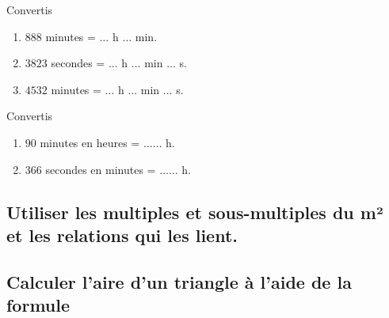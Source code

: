 
Convertis

\begin{enumerate}
\item $888$ minutes = $\ldots$ h  $\ldots$ min.
\item $3823$ secondes = $\ldots$ h $\ldots$ min  $\ldots$ s. 
\item $4532$ minutes = $\ldots$ h  $\ldots$ min  $\ldots$ s. 
\end{enumerate}




Convertis

\begin{enumerate}
\item $90$ minutes en heures = $\ldots\ldots$ h.
\item $366$ secondes en minutes = $\ldots\ldots$ h.
\end{enumerate}







\subsection{ Utiliser les multiples et sous-multiples du m² et les relations qui les lient.}







\subsection{ Calculer l’aire d’un triangle à l’aide de la formule }





